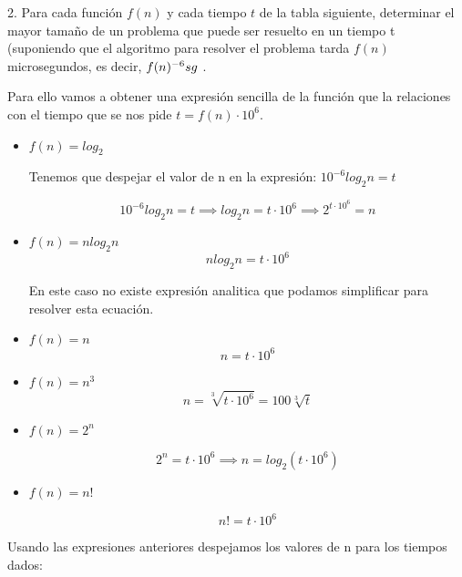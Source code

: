 
\begin{ejercicio}
  {2. Para cada función $f(n)$ y cada tiempo $t$ de la tabla siguiente, determinar el mayor tamaño de un problema que puede ser resuelto en un tiempo t (suponiendo que el algoritmo para resolver el problema tarda $f(n)$ microsegundos, es decir, $f(n) \time 10 ^{-6} sg$ .}
\end{ejercicio}


\begin{flushleft}
  Para ello vamos a obtener una expresión sencilla de la función que
  la relaciones con el tiempo que se nos pide $t = f(n)\cdot 10^6$.
\end{flushleft}

\begin{itemize}
\item $f(n) = log_{2}$
  \begin{flushleft}
    Tenemos que despejar el valor de n en la expresión: $10^{-6}log_2n = t$
  \end{flushleft}
  \[
    10^{-6}log_2n = t \implies log_2n = t\cdot 10^6 \implies 2^{t\cdot 10^6} = n
  \]

\item $f(n) = nlog_2n$
  \[
    nlog_2n = t\cdot 10^6
  \]

  \begin{flushleft}
    En este caso no existe expresión analitica que podamos simplificar para resolver esta ecuación.
  \end{flushleft}

\item $f(n) = n$
  \[
    n = t \cdot 10^6
  \]

\item $f(n) = n^3$
  \[
    n = \sqrt[3]{t\cdot 10^6} = 100 \sqrt[3]{t}
  \]

\item $f(n) = 2^n$

  \[
    2^n = t \cdot 10^6 \implies n = log_2(t\cdot 10^6)
  \]

\item $f(n) = n!$

  \[
    n! = t\cdot 10^6
  \]
  
\end{itemize}

\begin{flushleft}
  Usando las expresiones anteriores despejamos los valores de n para los tiempos dados:
\end{flushleft}


